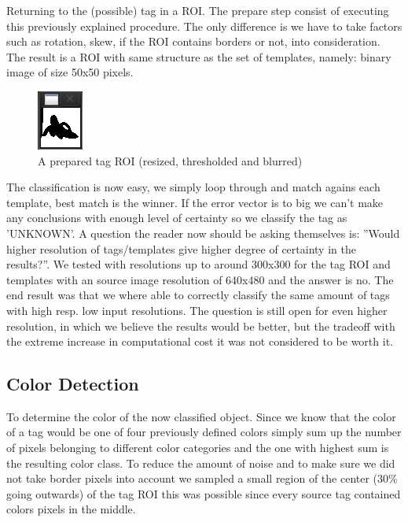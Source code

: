Returning to the (possible) tag in a ROI. The prepare step consist of executing this previously explained procedure. The only difference is we have to take factors such as rotation, skew, if the ROI contains borders or not, into consideration. The result is a ROI with same structure as the set of templates, namely: binary image of size 50x50 pixels.

\begin{figure}[h]
\label{fig:thresh}
    \begin{centering}
   	 \includegraphics[scale=1.2]{figures/thresh.png}
   	 \caption{A prepared tag ROI (resized, thresholded and blurred)}\label{fig:thresh}
    \end{centering}
\end{figure}

The classification is now easy, we simply loop through and match agains each template, best match is the winner. If the error vector is to big we can't make any conclusions with enough level of certainty so we classify the tag as 'UNKNOWN'. A question the reader now should be asking themselves is: ''Would higher resolution of tags/templates give higher degree of certainty in the results?''. We tested with resolutions up to around 300x300 for the tag ROI and templates with an source image resolution of 640x480 and the answer is no. The end result was that we where able to correctly classify the same amount of tags with high resp. low input resolutions. The question is still open for even higher resolution, in which we believe the results would be better, but the tradeoff with the extreme increase in computational cost it was not considered to be worth it.

\subsection{Color Detection}
To determine the color of the now classified object. Since we know that the color of a tag would be one of four previously defined colors simply sum up the number of pixels belonging to different color categories and the one with highest sum is the resulting color class. To reduce the amount of noise and to make sure we did not take border pixels into account we sampled a small region of the center (30\% going outwards) of the tag ROI this was possible since every source tag contained colors pixels in the middle.

